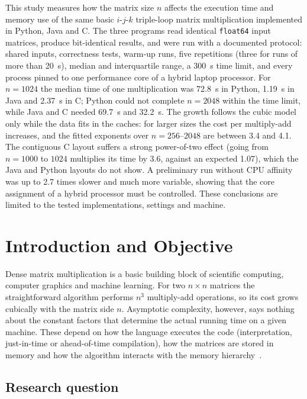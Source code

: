 \documentclass[12pt,a4paper]{report}
\begin{document}
This study measures how the matrix size $n$ affects the execution time and memory use of the same basic
$i$-$j$-$k$ triple-loop matrix multiplication implemented in Python, Java and C. The three programs read identical
\texttt{float64} input matrices, produce bit-identical results, and were run with a documented protocol: shared inputs,
correctness tests, warm-up runs, five repetitions (three for runs of more than 20~s), median and interquartile range,
a 300~s time limit, and every process pinned to one performance core of a hybrid laptop processor. For
$n = 1024$ the median time of one multiplication was 72.8~s in Python, 1.19~s in Java and 2.37~s in C; Python could not
complete $n = 2048$ within the time limit, while Java and C needed 69.7~s and 32.2~s. The growth follows the cubic model
only while the data fits in the caches: for larger sizes the cost per multiply-add increases, and the fitted exponents
over $n = 256$--$2048$ are between 3.4 and 4.1. The contiguous C layout suffers a strong power-of-two effect
(going from $n = 1000$ to $1024$ multiplies its time by 3.6, against an expected 1.07), which the Java and Python layouts
do not show. A preliminary run without CPU affinity was up to 2.7 times slower and much more variable, showing that the
core assignment of a hybrid processor must be controlled. These conclusions are limited to the tested implementations,
settings and machine.

\chapter{Introduction and Objective}

Dense matrix multiplication is a basic building block of scientific computing, computer graphics and machine
learning. For two $n \times n$ matrices the straightforward algorithm performs $n^3$ multiply-add operations, so its
cost grows cubically with the matrix side $n$. Asymptotic complexity, however, says nothing about the constant
factors that determine the actual running time on a given machine. These depend on how the language executes the code
(interpretation, just-in-time or ahead-of-time compilation), how the matrices are stored in memory and how the
algorithm interacts with the memory hierarchy~\cite{leiserson2020,drepper2007}.

\section{Research question}
\end{document}
